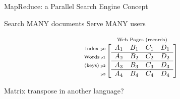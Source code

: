\begin{frame}{MapReduce: a Parallel Search Engine Concept}
\begin{block}{Search MANY documents \hfill Serve MANY users}
\begin{center}
\begin{equation*}
\begin{array}{c@{\hspace{-2ex}}r@{\hspace{-2ex}}c}
          \begin{array}{c}
            \mbox{\scriptsize Index} \\
            \mbox{\scriptsize Words} \\
            \mbox{\scriptsize (keys)}
          \end{array} &
          \begin{array}{c}
            \\  \mbox{\tiny p0} \\ \mbox{\tiny p1} \\
            \mbox{\tiny p2} \\ \mbox{\tiny p3}
          \end{array} &
          \begin{array}{c}
            \mbox{\scriptsize Web Pages (records)} \\
            \left[
            \begin{array}{cccc}
              A_1 & B_1  & C_1 & D_1 \\
              \hline
              A_2 & B_2  & C_2 & D_2 \\
              \hline
              A_3 & B_3  & C_3 & D_3 \\
              \hline
              A_4 & B_4  & C_4 & D_4
            \end{array}
            \right]
          \end{array}
        \end{array}
      \end{equation*}
    \end{center}
    \vspace{2em}
    \begin{center}
      Matrix transpose in another language?
    \end{center}
  \end{block}
\end{frame}

